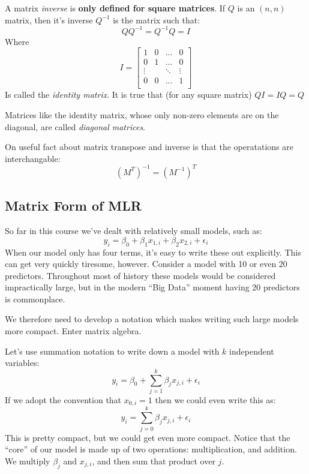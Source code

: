 \documentclass[
]{article}
\begin{document}
A matrix \emph{inverse} is \textbf{only defined for square matrices}. If
\(Q\) is an \((n,n)\) matrix, then it's inverse \(Q^{-1}\) is the matrix
such that: \[
QQ^{-1} = Q^{-1}Q = I
\] Where \[
I = \left[
\begin{array}{cccc}
1 & 0 & ... & 0\\
0 & 1 & ... & 0\\
\vdots & & \ddots & \vdots\\
0 & 0 & ... & 1\\
\end{array}
\right]
\] Is called the \emph{identity matrix}. It is true that (for any square
matrix) \(QI = IQ= Q\)

Matrices like the identity matrix, whose only non-zero elements are on
the diagonal, are called \emph{diagonal matrices}.

On useful fact about matrix transpose and inverse is that the
operatations are interchangable: \[
(M^T)^{-1} = (M^{-1})^T
\]

\hypertarget{matrix-form-of-mlr}{%
\subsection{Matrix Form of MLR}\label{matrix-form-of-mlr}}

So far in this course we've dealt with relatively small models, such as:
\[
y_i = \beta_0 + \beta_1 x_{1,i} + \beta_2 x_{2,i} + \epsilon_i
\] When our model only has four terms, it's easy to write these out
explicitly. This can get very quickly tiresome, however. Consider a
model with 10 or even 20 predictors. Throughout most of history these
models would be considered impractically large, but in the modern ``Big
Data'' moment having 20 predictors is commonplace.

We therefore need to develop a notation which makes writing such large
models more compact. Enter matrix algebra.

Let's use summation notation to write down a model with \(k\)
independent variables: \[
y_i = \beta_0 + \sum\limits_{j=1}^{k} \beta_j x_{j,i} + \epsilon_i
\] If we adopt the convention that \(x_{0,i} = 1\) then we could even
write this as: \[
y_i = \sum\limits_{j=0}^{k} \beta_j x_{j,i} + \epsilon_i
\] This is pretty compact, but we could get even more compact. Notice
that the ``core'' of our model is made up of two operations:
multiplication, and addition. We multiply \(\beta_j\) and \(x_{j,i}\),
and then sum that product over \(j\).
\end{document}
